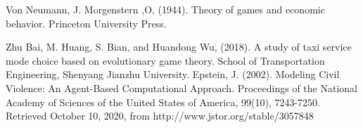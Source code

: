 \documentclass[12pt]{report}
\begin{document}
\begin{thebibliography}{2}
Von Neumann, J. Morgenstern ,O, (1944). Theory of games and economic behavior. Princeton University Press.

Zhu Bai, M. Huang, S. Bian, and Huandong Wu, (2018). A study of taxi service mode choice based on evolutionary game theory. School of Transportation Engineering, Shenyang Jianzhu University.
Epstein, J. (2002). Modeling Civil Violence: An Agent-Based Computational Approach. Proceedings of the National Academy of Sciences of the United States of America, 99(10), 7243-7250. Retrieved October 10, 2020, from http://www.jstor.org/stable/3057848
\end{thebibliography}
\end{document}
